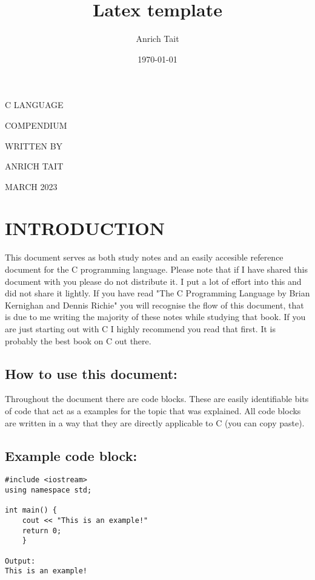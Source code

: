 \documentclass[a4paper]{article}
\author{Anrich Tait}
\date{\today}
\title{Latex template}
\begin{document}
\clearpage

\begin{titlepage}
\begin{center}
{\Large C LANGUAGE\par}
\vspace{2cm}
{\Large COMPENDIUM \par}
\vspace{2cm}
WRITTEN BY \par
\vspace{2cm}
{\Large ANRICH TAIT \par}
\vspace{2cm}
{\large MARCH 2023}
\end{center}
\vfill
\end{titlepage}

\tableofcontents
\clearpage

\section{INTRODUCTION}
This document serves as both study notes and an easily accesible reference document for the C programming language. Please note that if I have shared this document with you please do not distribute it. I put a lot of effort into this and did not share it lightly. If you have read "The C Programming Language by Brian Kernighan and Dennis Richie" you will recognise the flow of this document, that is due to me writing the majority of these notes while studying that book. If you are just starting out with C I highly recommend you read that first. It is probably the best book on C out there.

\subsection{How to use this document:}
Throughout the document there are code blocks. These are easily identifiable bits of code that act as a examples for the topic that was explained. All code blocks are written in a way that they are directly applicable to C (you can copy paste). 

\subsection{Example code block:}
\begin{lstlisting}
#include <iostream>
using namespace std;

int main() {
    cout << "This is an example!"
    return 0;
    }

Output:
This is an example!
\end{lstlisting}
\newpage
\end{document}
